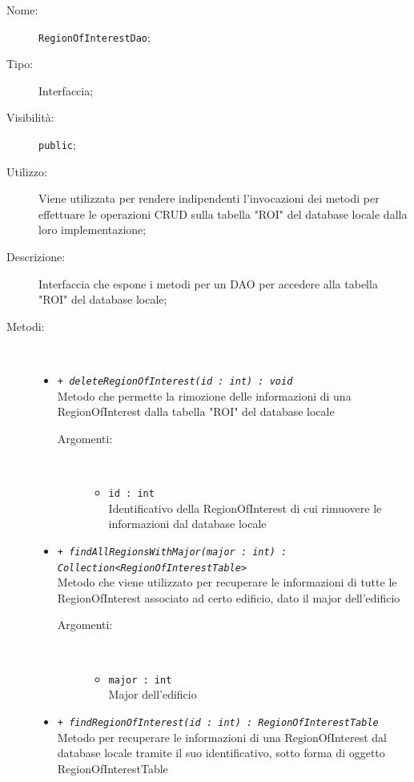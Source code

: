 \documentclass[../DefinizioneDiProdotto.tex]{subfiles}
\begin{document}
    \begin{description}
\item[Nome:] \texttt{RegionOfInterestDao};
\item[Tipo:] Interfaccia;
\item[Visibilità:] \texttt{public};
\item[Utilizzo:] Viene utilizzata per rendere indipendenti l'invocazioni dei metodi per effettuare le operazioni CRUD sulla tabella "ROI" del database locale dalla loro implementazione;
\item[Descrizione:] Interfaccia che espone i metodi per un DAO per accedere alla tabella "ROI" del database locale;
\item[Metodi:] \
\begin{itemize}
\item \texttt{+ \textit{deleteRegionOfInterest(id : int) : void}}\\
Metodo che permette la rimozione delle informazioni di una RegionOfInterest dalla tabella "ROI" del database locale
 \begin{description}
\item[Argomenti:] \
\begin{itemize}
\item \texttt{id : int}\\
Identificativo della RegionOfInterest di cui rimuovere le informazioni dal database locale\end{itemize}
\end{description}
\item \texttt{+ \textit{findAllRegionsWithMajor(major : int) : Collection<RegionOfInterestTable>}}\\
Metodo che viene utilizzato per recuperare le informazioni di tutte le RegionOfInterest associato ad certo edificio, dato il major dell'edificio
 \begin{description}
\item[Argomenti:] \
\begin{itemize}
\item \texttt{major : int}\\
Major dell'edificio\end{itemize}
\end{description}
\item \texttt{+ \textit{findRegionOfInterest(id : int) : RegionOfInterestTable}}\\
Metodo per recuperare le informazioni di una RegionOfInterest dal database locale tramite il suo identificativo, sotto forma di oggetto RegionOfInterestTable
 \begin{description}

\end{description}
\end{itemize}
\end{description}
\end{document}
